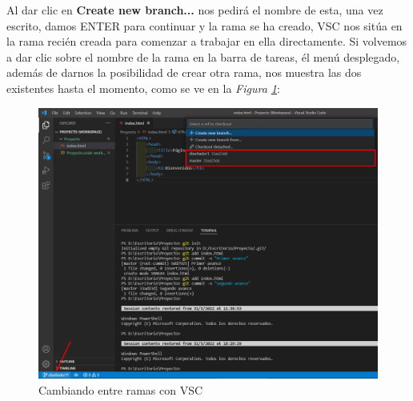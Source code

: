 \begin{enumerate}
    Al dar clic en \textbf{Create new branch...} nos pedirá el nombre de esta, una vez escrito, damos ENTER para continuar y la rama se ha creado, VSC nos sitúa en la rama recién creada para comenzar a trabajar en ella directamente. Si volvemos a dar clic sobre el nombre de la rama en la barra de tareas, él menú desplegado, además de darnos la posibilidad de crear otra rama, nos muestra las dos existentes hasta el momento, como se ve en la \textit{Figura \ref{fig: 18}}:
    \begin{figure}[H]
        \centering
        \caption{Cambiando entre ramas con VSC}
        \label{fig: 18}
        \includegraphics[width=\textwidth]{capturas/abriendo_b1.png}
    \end{figure}
    

\end{enumerate}
